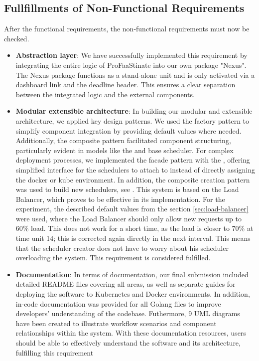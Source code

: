 \subsection*{Fullfillments of Non-Functional Requirements}
After the functional requirements, the non-functional requirements must now be checked.
\begin{itemize}
    \item \textbf{Abstraction layer}: We have successfully implemented this requirement by integrating the entire logic of ProFaaStinate into our own package "Nexus". The Nexus package functions as a stand-alone unit and is only activated via a dashboard link and the deadline header. This ensures a clear separation between the integrated logic and the external components.
    \item \textbf{Modular extensible architecture}: In building our modular and extensible architecture, we applied key design patterns. We used the factory pattern to simplify component integration by providing default values where needed. Additionally, the composite pattern facilitated component structuring, particularly evident in models like the  and base scheduler. For complex deployment processes, we implemented the facade pattern with the , offering simplified interface for the schedulers to attach to instead of directly assigning the docker or kube environment. 
    In addition, the composite creation pattern was used to build new schedulers, see . This system is based on the Load Balancer, which proves to be effective in its implementation. For the experiment, the described default values from the section \ref{sec:load-balancer} were used, where the Load Balancer should only allow new requests up to 60\% load. This does not work for a short time, as the load is closer to 70\% at time unit 14; this is corrected again directly in the next interval. This means that the scheduler creator does not have to worry about his scheduler overloading the system.
    This requirement is considered fulfilled.

    \item \textbf{Documentation}: In terms of documentation, our final submission included detailed README files covering all areas, as well as separate guides for deploying the software to Kubernetes and Docker environments. In addition, in-code documentation was provided for all Golang files to improve developers' understanding of the codebase. Futhermore, 9 UML diagrams have been created to illustrate workflow scenarios and component relationships within the system. With these documentation resources, users should be able to effectively understand the software and its architecture, fulfilling this requirement


\end{itemize}
